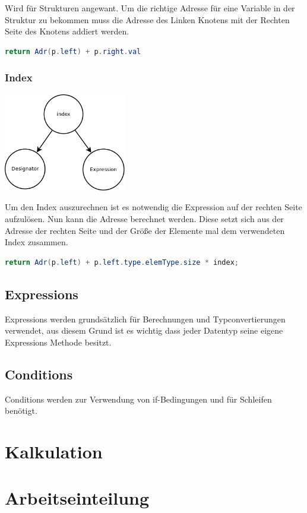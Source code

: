 Wird für Strukturen angewant. Um die richtige Adresse für eine Variable in der Struktur zu bekommen muss die Adresse des Linken
Knotens mit der Rechten Seite des Knotens addiert werden.

\begin{lstlisting}[language=JAVA]
return Adr(p.left) + p.right.val
\end{lstlisting}

\subsubsection{Index}
\includegraphics[width=0.4\textwidth]{./media/images/interpreter/syntaxbaum/designators/index.png}

Um den Index auszurechnen ist es notwendig die Expression auf der rechten Seite aufzulösen.
Nun kann die Adresse berechnet werden. Diese setzt sich aus der Adresse der rechten Seite und der Größe der Elemente mal dem 
verwendeten Index zusammen.

\begin{lstlisting}[language=JAVA]
return Adr(p.left) + p.left.type.elemType.size * index;
\end{lstlisting}

\subsection{Expressions}
Expressions werden grundsätzlich für Berechnungen und Typconvertierungen verwendet, aus diesem Grund ist es wichtig dass jeder Datentyp seine
eigene Expressions Methode besitzt.

\subsection{Conditions}
Conditions werden zur Verwendung von if-Bedingungen und für Schleifen benötigt.

\section{Kalkulation}


\section{Arbeitseinteilung}